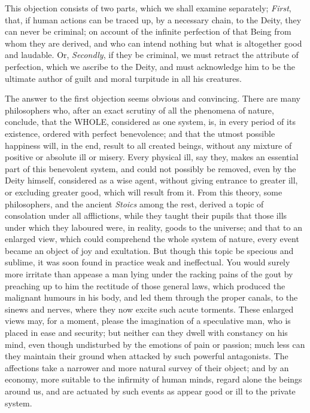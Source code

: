 \documentclass[]{article}
\begin{document}
\begin{sectionbody}
\humeparagraph  This objection consists of two parts, which we shall examine separately; \emph{First}, that, if human actions can be traced up, by a necessary chain, to the Deity, they can never be criminal; on account of the infinite perfection of that Being from whom they are derived, and who can intend nothing but what is altogether good and laudable. Or, \emph{Secondly}, if they be criminal, we must retract the attribute of perfection, which we ascribe to the Deity, and must acknowledge him to be the ultimate author of guilt and moral turpitude in all his creatures.

\humeparagraph  The answer to the first objection seems obvious and convincing. There are many philosophers who, after an exact scrutiny of all the phenomena of nature, conclude, that the WHOLE, considered as one system, is, in every period of its existence, ordered with perfect benevolence; and that the utmost possible happiness will, in the end, result to all created beings, without any mixture of positive or absolute ill or misery. Every physical ill, say they, makes an essential part of this benevolent system, and could not possibly be removed, even by the Deity himself, considered as a wise agent, without giving entrance to greater ill, or excluding greater good, which will result from it. From this theory, some philosophers, and the ancient \emph{Stoics} among the rest, derived a topic of consolation under all afflictions, while they taught their pupils that those ills under which they laboured were, in reality, goods to the universe; and that to an enlarged view, which could comprehend the whole system of nature, every event became an object of joy and exultation. But though this topic be specious and sublime, it was soon found in practice weak and ineffectual. You would surely more irritate than appease a man lying under the racking pains of the gout by preaching up to him the rectitude of those general laws, which produced the malignant humours in his body, and led them through the proper canals, to the sinews and nerves, where they now excite such acute torments. These enlarged views may, for a moment, please the imagination of a speculative man, who is placed in ease and security; but neither can they dwell with constancy on his mind, even though undisturbed by the emotions of pain or passion; much less can they maintain their ground when attacked by such powerful antagonists. The affections take a narrower and more natural survey of their object; and by an economy, more suitable to the infirmity of human minds, regard alone the beings around us, and are actuated by such events as appear good or ill to the private system.


\end{sectionbody}
\end{document}
